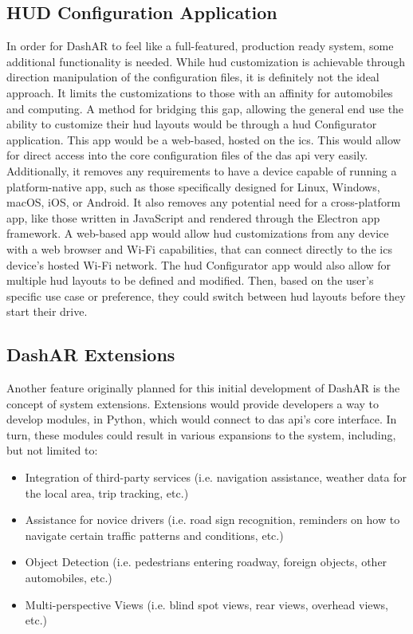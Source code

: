     \subsection{HUD Configuration Application}
        \par In order for DashAR to feel like a full-featured, production ready system, some additional functionality is needed. While \gls{hud} customization is achievable through direction manipulation of the configuration files, it is definitely not the ideal approach. It limits the customizations to those with an affinity for automobiles and computing. A method for bridging this gap, allowing the general end use the ability to customize their \gls{hud} layouts would be through a \gls{hud} Configurator application. This app would be a web-based, hosted on the \gls{ics}. This would allow for direct access into the core configuration files of the \gls{das} \gls{api} very easily. Additionally, it removes any requirements to have a device capable of running a platform-native app, such as those specifically designed for Linux, Windows, macOS, iOS, or Android. It also removes any potential need for a cross-platform app, like those written in JavaScript and rendered through the Electron app framework. A web-based app would allow \gls{hud} customizations from any device with a web browser and Wi-Fi capabilities, that can connect directly to the \gls{ics} device's hosted Wi-Fi network. The \gls{hud} Configurator app would also allow for multiple \gls{hud} layouts to be defined and modified. Then, based on the user's specific use case or preference, they could switch between \gls{hud} layouts before they start their drive.

    \subsection{DashAR Extensions}
        \par Another feature originally planned for this initial development of DashAR is the concept of system extensions. Extensions would provide developers a way to develop modules, in Python, which would connect to \gls{das} \gls{api}'s core interface. In turn, these modules could result in various expansions to the system, including, but not limited to:

        \begin{itemize}
            \item Integration of third-party services (i.e. navigation assistance, weather data for the local area, trip tracking, etc.)
            \item Assistance for novice drivers (i.e. road sign recognition, reminders on how to navigate certain traffic patterns and conditions, etc.)
            \item Object Detection (i.e. pedestrians entering roadway, foreign objects, other automobiles, etc.)
            \item Multi-perspective Views (i.e. blind spot views, rear views, overhead views, etc.)
        \end{itemize}

